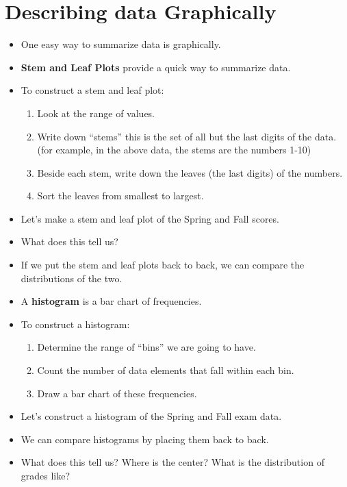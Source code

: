 \documentclass{article}
\begin{document}
\section{Describing data Graphically}
\begin{itemize}
    \item One easy way to summarize data is graphically.
    \item \textbf{Stem and Leaf Plots} provide a quick way to summarize data.
    \item To construct a stem and leaf plot:
    \begin{enumerate}
        \item Look at the range of values.
        \item Write down ``stems'' this is the set of all but the last digits of the data.
           (for example, in the above data, the stems are the numbers 1-10)
        \item Beside each stem, write down the leaves (the last digits) of the numbers.
        \item Sort the leaves from smallest to largest.
    \end{enumerate}
    \item Let's make a stem and leaf plot of the Spring and Fall scores.
    \item What does this tell us?
    \item If we put the stem and leaf plots back to back, we can compare the distributions of the two.
    \item A \textbf{histogram} is a bar chart of frequencies.
    \item To construct a histogram:
    \begin{enumerate}
        \item Determine the range of ``bins'' we are going to have.
        \item Count the number of data elements that fall within each bin.
        \item Draw a bar chart of these frequencies.
    \end{enumerate}
    \item Let's construct a histogram of the Spring and Fall exam data.
    \item We can compare histograms by placing them back to back.
    \item What does this tell us?  Where is the center?  What is the distribution of grades like?
\end{itemize}
\end{document}
